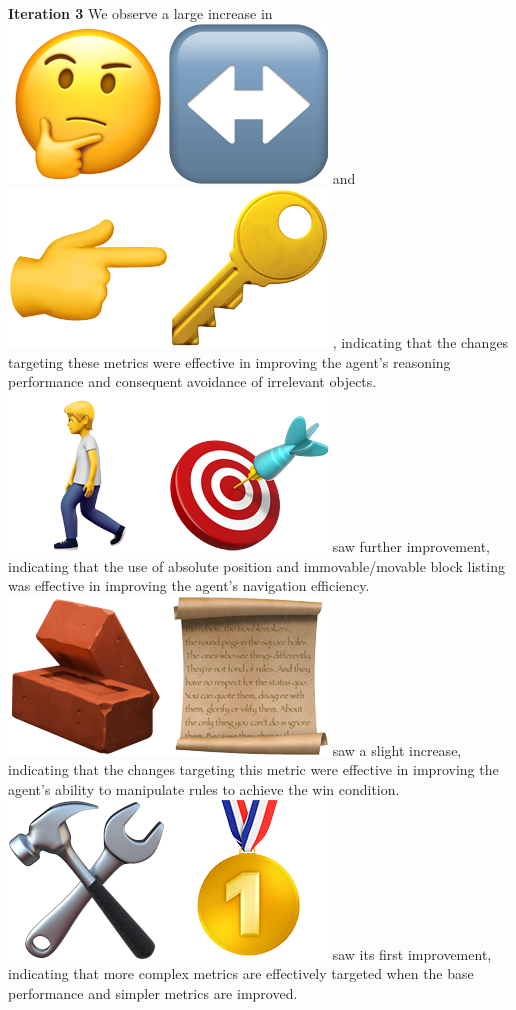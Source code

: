 \textbf{Iteration 3} We observe a large increase in
\includegraphics[scale=0.07]{figs/emojis/emoji_4.png}
and
\includegraphics[scale=0.07]{figs/emojis/emoji_6.png}
, indicating that the changes targeting these metrics were effective in improving
the agent's reasoning performance and consequent avoidance of irrelevant objects.
\includegraphics[scale=0.07]{figs/emojis/emoji_3.png}
saw further improvement, indicating that the use of absolute position and immovable/movable
block listing was effective in improving the agent's navigation efficiency.
\includegraphics[scale=0.07]{figs/emojis/emoji_7.png}
saw a slight increase, indicating that the changes targeting this metric were effective
in improving the agent's ability to manipulate rules to achieve the win condition.
\includegraphics[scale=0.07]{figs/emojis/emoji_5.png}
saw its first improvement, indicating that more complex metrics are effectively targeted
when the base performance and simpler metrics are improved.

